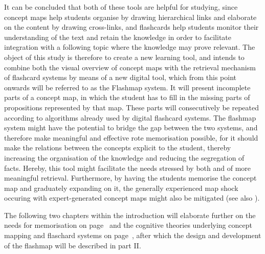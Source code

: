 It can be concluded that both of these tools are helpful for studying, since concept maps help students organise by drawing hierarchical links and elaborate on the content by drawing cross-links, and flashcards help students monitor their understanding of the text and retain the knowledge in order to facilitate integration with a following topic where the knowledge may prove relevant. The object of this study is therefore to create a new learning tool, and intends to combine both the visual overview of concept maps with the retrieval mechanism of flashcard systems by means of a new digital tool, which from this point onwards will be referred to as the Flashmap system. It will present incomplete parts of a concept map, in which the student has to fill in the missing parts of propositions represented by that map. These parts will consecutively be repeated according to algorithms already used by digital flashcard systems. The flashmap system might have the potential to bridge the gap between the two systems, and therefore make meaningful and effective rote memorisation possible, for it should make the relations between the concepts explicit to the student, thereby increasing the organisation of the knowledge and reducing the segregation of facts. Hereby, this tool might facilitate the needs stressed by both  and  of more meaningful retrieval. Furthermore, by having the students memorise the concept map and graduately expanding on it, the generally experienced map shock occuring with expert-generated concept maps might also be mitigated (see also ).

The following two chapters within the introduction will elaborate further on the needs for memorisation on page~\pageref{ch:context} and the cognitive theories underlying concept mapping and flaschard systems on page~\pageref{ch:theory}, after which the design and development of the flashmap will be described in part II.
